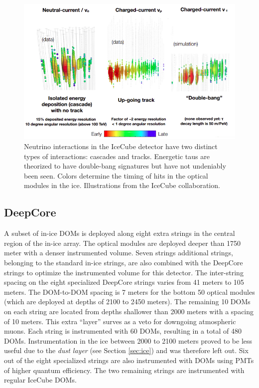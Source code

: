 \begin{figure}
\centering
\includegraphics[width=\textwidth]{chapter4/img/ICinteractions2.png}
\caption{Neutrino interactions in the IceCube detector have two distinct types of interactions: cascades and tracks. Energetic taus are theorized to have double-bang signatures but have not undeniably been seen. Colors determine the timing of hits in the optical modules in the ice. Illustrations from the IceCube collaboration.}
\label{fig:ICinteractions2}
\end{figure}
 
\subsection{DeepCore}
\label{subsec:DC}
A subset of in-ice DOMs is deployed along eight extra strings in the central region of the in-ice array. The optical modules are deployed deeper than 1750 meter with a denser instrumented volume. Seven strings additional strings, belonging to the standard in-ice strings, are also combined with the DeepCore strings to optimize the instrumented volume for this detector. The inter-string spacing on the eight specialized DeepCore strings varies from 41 meters to 105 meters. The DOM-to-DOM spacing is 7 meters for the bottom 50 optical modules (which are deployed at depths of 2100 to 2450 meters). The remaining 10 DOMs on each string are located from depths shallower than 2000 meters with a spacing of 10 meters. This extra ``layer'' surves as a veto for downgoing atmospheric muons. Each string is instrumented with 60 DOMs, resulting in a total of 480 DOMs. Instrumentation in the ice between 2000 to 2100 meters proved to be less useful due to the \textit{dust layer} (see Section \ref{sec:ice}) and was therefore left out. Six out of the eight specialized strings are also instrumented with DOMs using PMTs of higher quantum efficiency. The two remaining strings are instrumented with regular IceCube DOMs.

